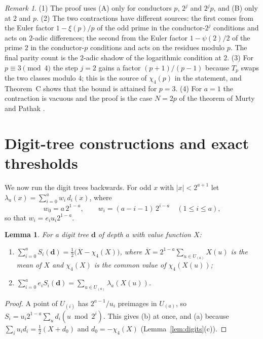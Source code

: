 \documentclass[11pt,a4paper]{article}
\newtheorem{lemma}[theorem]{Lemma}
\theoremstyle{definition}
\theoremstyle{remark}
\newtheorem{remark}[theorem]{Remark}
\newcommand{\Uu}[1]{U_{(#1)}}
\begin{document}
\begin{remark}\label{rem:B}
(1) The proof uses (A) only for conductors $p$, $2^j$ and $2^jp$, and (B) only at $2$ and $p$.
(2) The two contractions have different sources: the first comes from the Euler factor $1-\xi(p)/p$ of the odd prime in the conductor-$2^j$ conditions and acts on $2$-adic differences; the second from the Euler factor $1-\psi(2)/2$ of the prime $2$ in the conductor-$p$ conditions and acts on the residues modulo $p$. The final parity count is the $2$-adic shadow of the logarithmic condition at $2$.
(3) For $p\equiv3\pmod4$ the step $j=2$ gains a factor $(p+1)/(p-1)$ because $T_p$ swaps the two classes modulo $4$; this is the source of $\chi_4(p)$ in the statement, and Theorem~C shows that the bound is attained for $p=3$.
(4) For $a=1$ the contraction is vacuous and the proof is the case $N=2p$ of the theorem of Murty and Pathak \cite{MP22}.
\end{remark}

\section{Digit-tree constructions and exact thresholds}\label{sec:constructions}

We now run the digit trees backwards. For odd $x$ with $|x|<2^{a+1}$ let $\lambda_a(x)=\sum_{i=0}^aw_i\,d_i(x)$, where
\[
w_0=a\,2^{1-a},\qquad w_i=(a-i-1)\,2^{i-a}\quad(1\le i\le a),
\]
so that $w_i=e_iu_i2^{1-a}$.

\begin{lemma}\label{lem:levelsums}
For a digit tree $\mathbf d$ of depth $a$ with value function $X$:
\begin{enumerate}[label=\textup{(\alph*)}]
\item $\sum_{i=0}^aS_i(\mathbf d)=\tfrac12\bigl(\overline X-\chi_4(X)\bigr)$, where $\overline X=2^{1-a}\sum_{u\in\Uu a}X(u)$ is the mean of $X$ and $\chi_4(X)$ is the common value of $\chi_4(X(u))$;
\item $\sum_{i=0}^ae_iS_i(\mathbf d)=\sum_{u\in\Uu a}\lambda_a(X(u))$.
\end{enumerate}
\end{lemma}

\begin{proof}
A point of $\Uu i$ has $2^{a-1}/u_i$ preimages in $\Uu a$, so $S_i=u_i2^{1-a}\sum_ud_i(u\bmod 2^i)$. This gives (b) at once, and (a) because $\sum_iu_id_i=\tfrac12(X+d_0)$ and $d_0=-\chi_4(X)$ (Lemma~\ref{lem:digits}(c)).
\end{proof}
\end{document}
